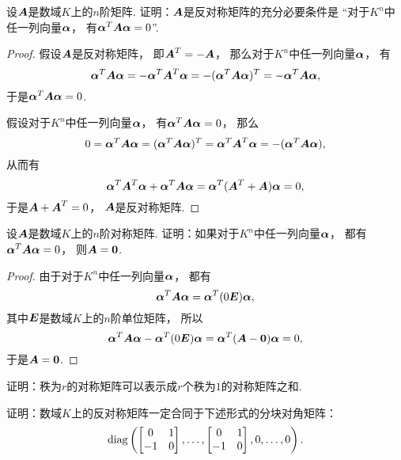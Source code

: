 \begin{example}\label{example:二次型.反对称矩阵对应的二次型恒为零}
设\(\boldsymbol{A}\)是数域\(K\)上的\(n\)阶矩阵.
证明：\(\boldsymbol{A}\)是反对称矩阵的充分必要条件是
“对于\(K^n\)中任一列向量\(\boldsymbol\alpha\)，
有\(\boldsymbol\alpha^T \boldsymbol{A} \boldsymbol\alpha = 0\)”.
\begin{proof}
假设\(\boldsymbol{A}\)是反对称矩阵，
即\(\boldsymbol{A}^T = -\boldsymbol{A}\)，
那么对于\(K^n\)中任一列向量\(\boldsymbol\alpha\)，
有\[
	\vb\alpha^T \vb{A} \vb\alpha
	= - \vb\alpha^T \vb{A}^T \vb\alpha
	= - (\vb\alpha^T \vb{A} \vb\alpha)^T
	= - \vb\alpha^T \vb{A} \vb\alpha, %
\]
于是\(\boldsymbol\alpha^T \boldsymbol{A} \boldsymbol\alpha = 0\).

假设对于\(K^n\)中任一列向量\(\boldsymbol\alpha\)，
有\(\boldsymbol\alpha^T \boldsymbol{A} \boldsymbol\alpha = 0\)，
那么\[
	0 = \boldsymbol\alpha^T \boldsymbol{A} \boldsymbol\alpha
	= (\boldsymbol\alpha^T \boldsymbol{A} \boldsymbol\alpha)^T
	= \boldsymbol\alpha^T \boldsymbol{A}^T \boldsymbol\alpha
	= - (\boldsymbol\alpha^T \boldsymbol{A} \boldsymbol\alpha),
\]
从而有\[
	\boldsymbol\alpha^T \boldsymbol{A}^T \boldsymbol\alpha
	+ \boldsymbol\alpha^T \boldsymbol{A} \boldsymbol\alpha
	= \boldsymbol\alpha^T (\boldsymbol{A}^T + \boldsymbol{A}) \boldsymbol\alpha
	= 0,
\]
于是\(\boldsymbol{A} + \boldsymbol{A}^T = 0\)，
\(\boldsymbol{A}\)是反对称矩阵.
\end{proof}
\end{example}
\begin{example}
设\(\boldsymbol{A}\)是数域\(K\)上的\(n\)阶对称矩阵.
证明：如果对于\(K^n\)中任一列向量\(\boldsymbol\alpha\)，
都有\(\boldsymbol\alpha^T \boldsymbol{A} \boldsymbol\alpha = 0\)，
则\(\boldsymbol{A} = \boldsymbol0\).
\begin{proof}
由于对于\(K^n\)中任一列向量\(\boldsymbol\alpha\)，
都有\[
	\boldsymbol\alpha^T \boldsymbol{A} \boldsymbol\alpha = \boldsymbol\alpha^T (0\boldsymbol{E}) \boldsymbol\alpha,
\]
其中\(\boldsymbol{E}\)是数域\(K\)上的\(n\)阶单位矩阵，
所以\[
	\boldsymbol\alpha^T \boldsymbol{A} \boldsymbol\alpha - \boldsymbol\alpha^T (0\boldsymbol{E}) \boldsymbol\alpha
	= \boldsymbol\alpha^T (\boldsymbol{A} - \boldsymbol0) \boldsymbol\alpha
	= 0,
\]
于是\(\boldsymbol{A} = \boldsymbol0\).
\end{proof}
\end{example}
\begin{example}
证明：秩为\(r\)的对称矩阵可以表示成\(r\)个秩为\(1\)的对称矩阵之和.
\end{example}
\begin{example}
证明：数域\(K\)上的反对称矩阵一定合同于下述形式的分块对角矩阵：\[
	\operatorname{diag}\left(
		\begin{bmatrix}
			0 & 1 \\
			-1 & 0
		\end{bmatrix},
		\dotsc,
		\begin{bmatrix}
			0 & 1 \\
			-1 & 0
		\end{bmatrix},
		0,\dotsc,0
	\right).
\]
\end{example}
